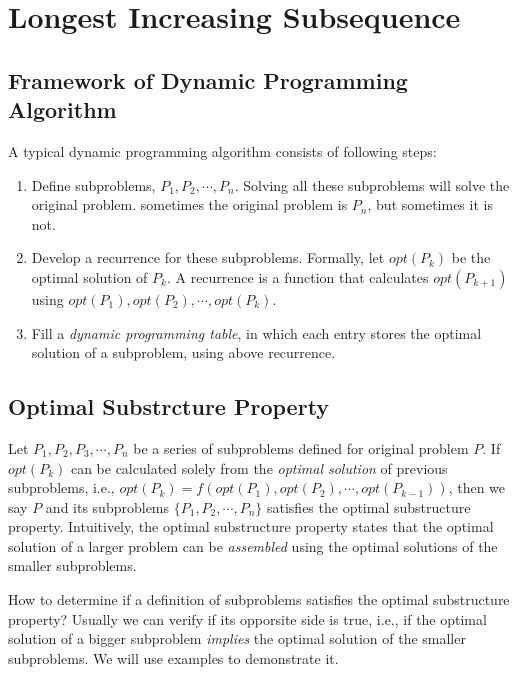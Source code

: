 \section{Longest Increasing Subsequence}

\subsection*{Framework of Dynamic Programming Algorithm}

A typical dynamic programming algorithm consists of following steps:
\begin{enumerate}
\item Define subproblems, %
$P_1, P_2, \cdots, P_n$. Solving all these subproblems will solve the original problem.
sometimes the original problem is $P_n$, but sometimes it is not.
\item Develop a recurrence for these subproblems. Formally, let $opt(P_k)$ be the optimal
solution of $P_k$. A recurrence is a function that calculates
$opt(P_{k+1})$ using $opt(P_1), opt(P_2), \cdots, opt(P_k)$.
\item Fill a \emph{dynamic programming table},
in which each entry stores the optimal solution of a subproblem, 
using above recurrence.
\end{enumerate}

\subsection*{Optimal Substrcture Property}

Let $P_1, P_2, P_3, \cdots, P_n$ be a series of subproblems defined for original problem $P$.
If  $opt(P_k)$ can be calculated solely from the \emph{optimal solution} of previous subproblems,
i.e., $opt(P_k) = f(opt(P_1), opt(P_2), \cdots, opt(P_{k-1}))$,
then we say $P$ and its subproblems $\{P_1, P_2, \cdots, P_n\}$ satisfies the optimal substructure property.
Intuitively, the optimal substructure property states that
the optimal solution of a larger problem can be \emph{assembled}
using the optimal solutions of the smaller subproblems.

How to determine if a definition of subproblems satisfies the optimal substructure property?
Usually we can verify if its opporsite side is true, i.e., if the optimal solution
of a bigger subproblem \emph{implies} the optimal solution of
the smaller subproblems.
We will use examples to demonstrate it.


